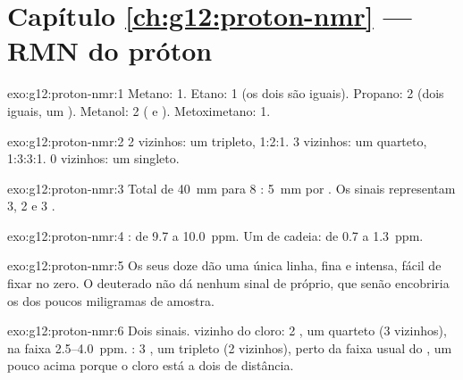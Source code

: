 \section*{Capítulo \ref{ch:g12:proton-nmr} --- RMN do próton}

\begin{solution}{exo:g12:proton-nmr:1}
Metano: 1. Etano: 1 (os dois  são iguais). Propano: 2 (dois
 iguais, um ). Metanol: 2 ( e ).
Metoximetano: 1.
\end{solution}

\begin{solution}{exo:g12:proton-nmr:2}
2 vizinhos: um tripleto, 1:2:1. 3 vizinhos: um quarteto, 1:3:3:1.
0 vizinhos: um singleto.
\end{solution}

\begin{solution}{exo:g12:proton-nmr:3}
Total de \qty{40}{mm} para 8 : \qty{5}{mm} por . Os sinais
representam 3, 2 e 3 .
\end{solution}

\begin{solution}{exo:g12:proton-nmr:4}
: de 9.7 a \qty{10.0}{ppm}. Um  de cadeia: de 0.7 a
\qty{1.3}{ppm}.
\end{solution}

\begin{solution}{exo:g12:proton-nmr:5}
Os seus doze  dão uma única linha, fina e intensa,
fácil de fixar no zero. O  deuterado não dá nenhum sinal de
 próprio, que senão encobriria os dos poucos miligramas de
amostra.
\end{solution}

\begin{solution}{exo:g12:proton-nmr:6}
Dois sinais.  vizinho do cloro: 2 , um quarteto (3
vizinhos), na faixa 2.5--\qty{4.0}{ppm}. : 3 , um
tripleto (2 vizinhos), perto da faixa usual do , um pouco acima
porque o cloro está a dois  de distância.
\end{solution}

